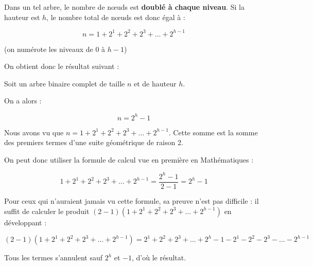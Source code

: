 \documentclass[
  a4paper,
  DIV=11,
  numbers=noendperiod]{scrartcl}
\begin{document}
Dans un tel arbre, le nombre de nœuds est \textbf{doublé à chaque
niveau}. Si la hauteur est \(h\), le nombre total de nœuds est donc égal
à :

\[n=1+2^1+2^2+2^3+\ldots+2^{h-1}\]

(on numérote les niveaux de \(0\) à \(h-1\))

On obtient donc le résultat suivant :

\begin{tcolorbox}[enhanced jigsaw, opacitybacktitle=0.6, title=\textcolor{quarto-callout-important-color}{\faExclamation}\hspace{0.5em}{Lien entre hauteur et taille d'un arbre binaire complet}, coltitle=black, left=2mm, breakable, opacityback=0, bottomtitle=1mm, colback=white, leftrule=.75mm, rightrule=.15mm, bottomrule=.15mm, titlerule=0mm, arc=.35mm, colbacktitle=quarto-callout-important-color!10!white, toprule=.15mm, toptitle=1mm]

Soit un arbre binaire complet de taille \(n\) et de hauteur \(h\).

On a alors :

\[n=2^h-1\]

\end{tcolorbox}

\begin{tcolorbox}[enhanced jigsaw, opacitybacktitle=0.6, title=\textcolor{quarto-callout-caution-color}{\faFire}\hspace{0.5em}{Preuve}, coltitle=black, left=2mm, breakable, opacityback=0, bottomtitle=1mm, colback=white, leftrule=.75mm, rightrule=.15mm, bottomrule=.15mm, titlerule=0mm, arc=.35mm, colbacktitle=quarto-callout-caution-color!10!white, toprule=.15mm, toptitle=1mm]

Nous avons vu que \(n=1+2^1+2^2+2^3+\ldots+2^{h-1}\). Cette somme est la
somme des premiers termes d'une suite géométrique de raison 2.

On peut donc utiliser la formule de calcul vue en première en
Mathématiques :

\[1+2^1+2^2+2^3+\ldots+2^{h-1} = \frac{2^h-1}{2-1}=2^h-1\]

Pour ceux qui n'auraient jamais vu cette formule, sa preuve n'est pas
difficile : il suffit de calculer le produit
\((2-1)(1+2^1+2^2+2^3+\ldots+2^{h-1})\) en développant :

\[(2-1)(1+2^1+2^2+2^3+\ldots+2^{h-1})= 2^1+2^2+2^3+\ldots+2^{h} -1-2^1-2^2-2^3-\ldots-2^{h-1}\]

Tous les termes s'annulent sauf \(2^{h}\) et \(-1\), d'où le résultat.

\end{tcolorbox}
\end{document}
